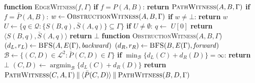 \begin{algorithm}[t]
\caption{Succinctness witnesses}
\label{alg:edge-witness}
\begin{algorithmic}[1]
\raggedright
\STATE \textbf{function} \textsc{EdgeWitness}(\(f,\Gamma\))
\STATE \textbf{if} \(f=P(A,B)\):
\STATE \hspace{\algorithmicindent}
       \textbf{return} \(\textsc{PathWitness}(A,B,\Gamma)\)
\STATE \textbf{if} \(f=\bar P(A,B)\):
\STATE \hspace{\algorithmicindent}
       \(w\leftarrow\textsc{ObstructionWitness}(A,B,\Gamma)\)
\STATE \hspace{\algorithmicindent}
       \textbf{if} \(w\neq\bot\): \textbf{return} \(w\)
\STATE \hspace{\algorithmicindent}
       \(U\leftarrow\{q\in\mathcal Q:\{S(B,q),\bar S(A,q)\}
       \subseteq\Gamma\}\)
\STATE \hspace{\algorithmicindent} \textbf{if} \(U\neq\emptyset\):
\STATE \hspace{2\algorithmicindent} \(q\leftarrow\) \(U[0]\)
\STATE \hspace{2\algorithmicindent} \textbf{return} \(\langle S(B,q),\bar S(A,q)\rangle\)
\STATE \textbf{return} \(\bot\)
\vspace{0.4ex}
\STATE \textbf{function} \textsc{ObstructionWitness}(\(A,B,\Gamma\))
\STATE \((d_L,r_L)\leftarrow\textsc{BFS}(A,E(\Gamma),\mathit{backward})\)
\STATE \((d_R,r_R)\leftarrow\textsc{BFS}(B,E(\Gamma),\mathit{forward})\)
\STATE \(\mathcal B\leftarrow\{(C,D)\in\mathcal L^2:
       \bar P(C,D)\in\Gamma \}\)
\STATE \textbf{if} \(\min_{\mathcal B} \{d_L(C) + d_R(D)\} = \infty\): \textbf{return} \(\bot\)
\STATE \((C,D)\leftarrow \operatorname{argmin}_{\mathcal B} \{ d_L(C)+d_R(D) \}\)
\STATE \textbf{return} \( \textsc{PathWitness}(C,A,\Gamma) \mathbin{\|}\langle\bar P(C,D) \rangle
       \mathbin{\|} \textsc{PathWitness}(B,D,\Gamma)\)
\end{algorithmic}
\end{algorithm}




